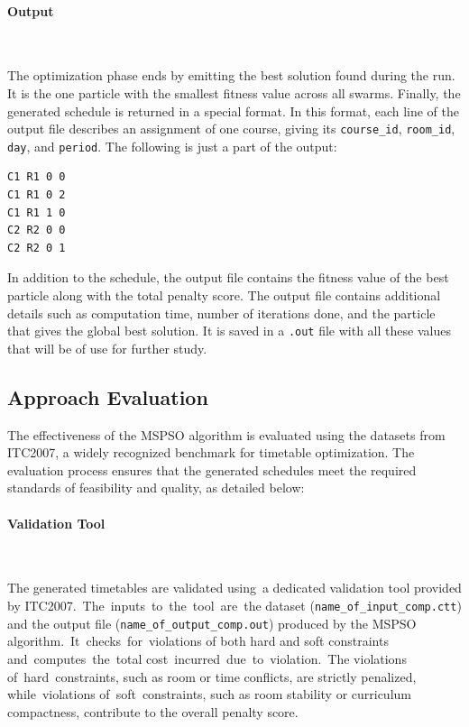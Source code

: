 \paragraph{Output}\

The optimization phase ends by emitting the best solution found during the run. It is the one particle with the smallest fitness value across all swarms. Finally, the generated schedule is returned in a special format. In this format, each line of the output file describes an assignment of one course, giving its \texttt{course\_id}, \texttt{room\_id}, \texttt{day}, and \texttt{period}. The following is just a part of the output:

\begin{verbatim}
C1 R1 0 0
C1 R1 0 2
C1 R1 1 0
C2 R2 0 0
C2 R2 0 1
\end{verbatim}

In addition to the schedule, the output file contains the fitness value of the best particle along with the total penalty score. The output file contains additional details such as computation time, number of iterations done, and the particle that gives the global best solution. It is saved in a \texttt{.out} file with all these values that will be of use for further study.


\subsection{Approach Evaluation}
\label{subsec:approach_evaluation}

The effectiveness of the MSPSO algorithm is evaluated using the datasets from ITC2007, a widely recognized benchmark for timetable optimization. The evaluation process ensures that the generated schedules meet the required standards of feasibility and quality, as detailed below:

\paragraph{Validation Tool}\

The generated timetables are validated using a dedicated validation tool provided by ITC2007. The inputs to the tool are the dataset (\texttt{name\_of\_input\_comp.ctt}) and the output file (\texttt{name\_of\_output\_comp.out}) produced by the MSPSO algorithm. It checks for violations of both hard and soft constraints and computes the total cost incurred due to violation. The violations of hard constraints, such as room or time conflicts, are strictly penalized, while violations of soft constraints, such as room stability or curriculum compactness, contribute to the overall penalty score.

